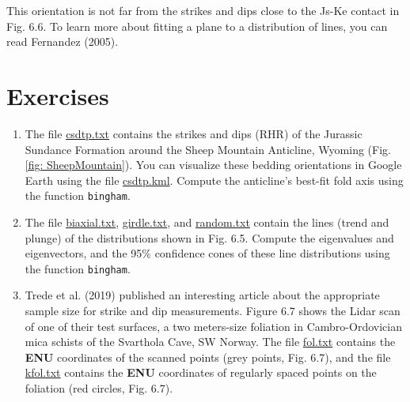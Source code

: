 \documentclass[a4paper , 12pt]{book}
\newcommand{\code}[1]{\colorbox{light-gray}{\texttt{#1}}}
\begin{document}
This orientation is not far from the strikes and dips close to the Js-Ke contact in Fig. 6.6. To learn more about fitting a plane to a distribution of lines, you can read Fernandez (2005).

\section{Exercises}

\begin{enumerate}
    \item The file \href{https://github.com/nfcd/compGeo/blob/master/source/data/ch6-exercise1/csdtp.txt}{csdtp.txt} contains the strikes and dips (RHR) of the Jurassic Sundance Formation around the Sheep Mountain Anticline, Wyoming (Fig. \ref{fig: SheepMountain}). You can visualize these bedding orientations in Google Earth using the file \href{https://github.com/nfcd/compGeo/blob/master/source/data/ch6-exercise1/csdtp.kml}{csdtp.kml}. Compute the anticline's best-fit fold axis using the function \code{bingham}.
    
    \item The file \href{https://github.com/nfcd/compGeo/blob/master/source/data/ch6-exercise2/biaxial.txt}{biaxial.txt}, \href{https://github.com/nfcd/compGeo/blob/master/source/data/ch6-exercise2/girdle.txt}{girdle.txt}, and \href{https://github.com/nfcd/compGeo/blob/master/source/data/ch6-exercise2/random.txt}{random.txt} contain the lines (trend and plunge) of the distributions shown in Fig. 6.5. Compute the eigenvalues and eigenvectors, and the 95$\%$ confidence cones of these line distributions using the function \code{bingham}.
    
    \item Trede et al. (2019) published an interesting article about the appropriate sample size for strike and dip measurements. Figure 6.7 shows the Lidar scan of one of their test surfaces, a two meters-size foliation in Cambro-Ordovician mica schists of the Svarthola Cave, SW Norway. The file \href{https://github.com/nfcd/compGeo/blob/master/source/data/ch6-exercise3/fol.txt}{fol.txt} contains the \textbf{ENU} coordinates of the scanned points (grey points, Fig. 6.7), and the file \href{https://github.com/nfcd/compGeo/blob/master/source/data/ch6-exercise3/kfol.txt}{kfol.txt} contains the \textbf{ENU} coordinates of regularly spaced points on the foliation (red circles, Fig. 6.7).
    

\end{enumerate}
\end{document}
